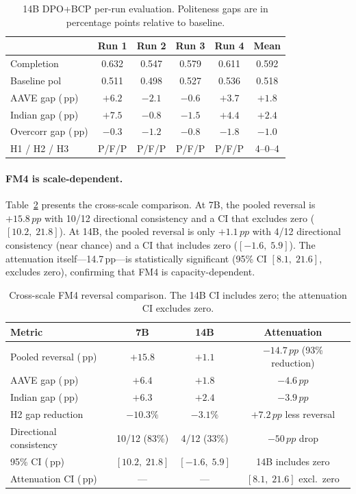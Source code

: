 \documentclass[11pt,a4paper]{article}
\newcommand{\pp}{\,pp}
\newcommand{\ci}[2]{[#1,\;#2]}
\begin{document}
\begin{table}[t]
\centering
\caption{14B DPO+BCP per-run evaluation. Politeness gaps are in percentage points relative to baseline.}
\label{tab:14b_eval}
\small
\begin{tabular}{lccccc}
\toprule
 & \textbf{Run 1} & \textbf{Run 2} & \textbf{Run 3} & \textbf{Run 4} & \textbf{Mean} \\
\midrule
Completion & 0.632 & 0.547 & 0.579 & 0.611 & 0.592 \\
Baseline pol & 0.511 & 0.498 & 0.527 & 0.536 & 0.518 \\
AAVE gap (\pp) & $+6.2$ & $-2.1$ & $-0.6$ & $+3.7$ & $+1.8$ \\
Indian gap (\pp) & $+7.5$ & $-0.8$ & $-1.5$ & $+4.4$ & $+2.4$ \\
Overcorr gap (\pp) & $-0.3$ & $-1.2$ & $-0.8$ & $-1.8$ & $-1.0$ \\
H1 / H2 / H3 & P/F/P & P/F/P & P/F/P & P/F/P & 4--0--4 \\
\bottomrule
\end{tabular}
\end{table}

\paragraph{FM4 is scale-dependent.}
Table~\ref{tab:cross_scale_fm4} presents the cross-scale comparison.
At 7B, the pooled reversal is $+15.8\pp$ with 10/12 directional consistency and a CI that excludes zero ($\ci{10.2}{21.8}$).
At 14B, the pooled reversal is only $+1.1\pp$ with 4/12 directional consistency (near chance) and a CI that includes zero ($\ci{-1.6}{5.9}$).
The attenuation itself---14.7\pp---is statistically significant (95\% CI $\ci{8.1}{21.6}$, excludes zero), confirming that FM4 is capacity-dependent.

\begin{table}[t]
\centering
\caption{Cross-scale FM4 reversal comparison. The 14B CI includes zero; the attenuation CI excludes zero.}
\label{tab:cross_scale_fm4}
\small
\begin{tabular}{lccc}
\toprule
\textbf{Metric} & \textbf{7B} & \textbf{14B} & \textbf{Attenuation} \\
\midrule
Pooled reversal (\pp) & $+15.8$ & $+1.1$ & $-14.7\pp$ (93\% reduction) \\
AAVE gap (\pp) & $+6.4$ & $+1.8$ & $-4.6\pp$ \\
Indian gap (\pp) & $+6.3$ & $+2.4$ & $-3.9\pp$ \\
H2 gap reduction & $-10.3\%$ & $-3.1\%$ & $+7.2\pp$ less reversal \\
Directional consistency & 10/12 (83\%) & 4/12 (33\%) & $-50\pp$ drop \\
95\% CI (\pp) & $\ci{10.2}{21.8}$ & $\ci{-1.6}{5.9}$ & 14B includes zero \\
Attenuation CI (\pp) & --- & --- & $\ci{8.1}{21.6}$ excl.\ zero \\
\bottomrule
\end{tabular}
\end{table}
\end{document}
